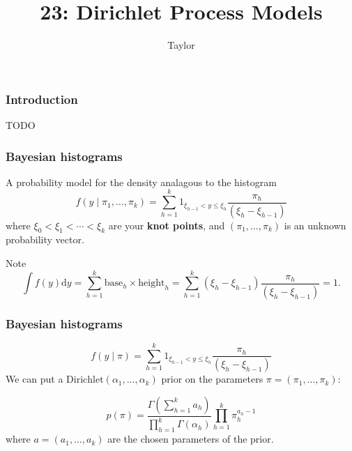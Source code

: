 \documentclass{beamer}
\title["23"]{23: Dirichlet Process Models}
\author{Taylor}
\institute[UVA] 
{
University of Virginia \\
\medskip
\textit{} 
}
\date{}
\begin{document}

\begin{frame}
\titlepage 
\end{frame}

\begin{frame}
\frametitle{Introduction}

TODO

\end{frame}
\begin{frame}
\frametitle{Bayesian histograms}

A probability model for the density analagous to the histogram 
$$
f(y \mid \pi_1, \ldots, \pi_k) = \sum_{h=1}^k 1_{\xi_{h-1} < y \le \xi_{h} } \frac{\pi_h}{(\xi_{h} - \xi_{h-1})}
$$
where $\xi_0 < \xi_1 < \cdots < \xi_k$ are your {\bf knot points}, and $(\pi_1, \ldots, \pi_k)$ is an unknown probability vector. 
\newline
\pause

Note
$$
\int f(y) \text{d}y = \sum_{h=1}^k \text{base}_h \times \text{height}_h = \sum_{h=1}^k (\xi_{h} - \xi_{h-1})\frac{\pi_h}{(\xi_{h} - \xi_{h-1})} = 1.
$$

\end{frame}


\begin{frame}
\frametitle{Bayesian histograms}

$$
f(y \mid \pi) = \sum_{h=1}^k 1_{\xi_{h-1} < y \le \xi_{h} } \frac{\pi_h}{(\xi_{h} - \xi_{h-1})}
$$
We can put a $\text{Dirichlet}(\alpha_1, \ldots, \alpha_k)$ prior on the parameters $\pi = (\pi_1, \ldots, \pi_k)$:

$$
p(\pi ) = \frac{\Gamma\left( \sum_{h=1}^k a_h \right) }{\prod_{h=1}^k \Gamma(\alpha_h) } \prod_{h=1}^k \pi_h^{a_h-1}
$$
where $a = (a_1, \ldots, a_k)$ are the chosen parameters of the prior.

\end{frame}
\end{document}
